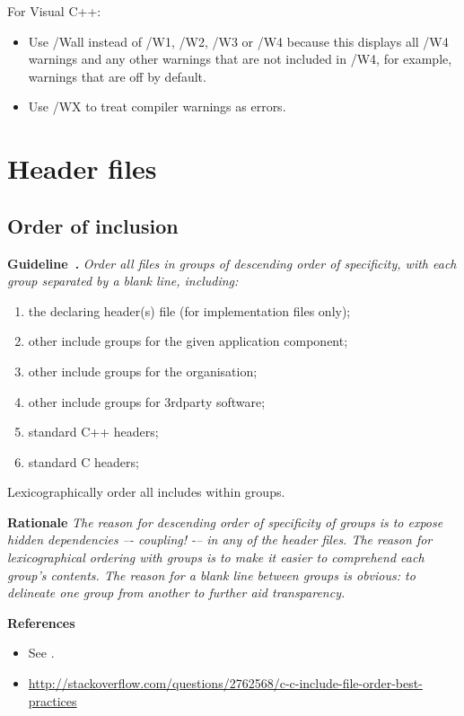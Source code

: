 \documentclass{article}
\newcounter{guideline}
\newenvironment{guideline}[1][]{\refstepcounter{guideline}\par\medskip
   \noindent \textbf{Guideline~\theguideline. #1} \em \rmfamily}{\medskip}
\newenvironment{rationale}{\par\medskip
   \noindent \textbf{Rationale} \em \rmfamily}{\medskip}
\newenvironment{references}{\par\medskip
   \noindent \textbf{References} \em \rmfamily \begin{itemize}}{\end{itemize}\medskip}
\begin{document}
For Visual C++:
\begin{itemize}
	\item Use /Wall instead of /W1, /W2, /W3 or /W4 because this displays all /W4 warnings and any other warnings that are not included in /W4, for example, warnings that are off by default.
	\item Use /WX to treat compiler warnings as errors.
\end{itemize}

\section{Header files}

\subsection{Order of inclusion}
\begin{guideline}
Order all files in groups of descending order of specificity, with each group separated by a blank line, including:
\begin{enumerate}
\item the declaring header(s) file (for implementation files only);
\item other include groups for the given application component;
\item other include groups for the organisation;
\item other include groups for 3rdparty software;
\item standard C++ headers;
\item standard C headers;
\end{enumerate}
Lexicographically order all includes within groups.
\begin{rationale}
The reason for descending order of specificity of groups is to expose hidden
dependencies –- coupling! -– in any of the header files.  The reason for
lexicographical ordering with groups is to make it easier to comprehend each
group’s contents.  The reason for a blank line between groups is obvious: to
delineate one group from another to further aid transparency.
\end{rationale}
\begin{references}
\item See \cite{wilson2016,sutter2004,lakos1996}.
\item \url{http://stackoverflow.com/questions/2762568/c-c-include-file-order-best-practices}
\end{references}
\end{guideline}
\end{document}
